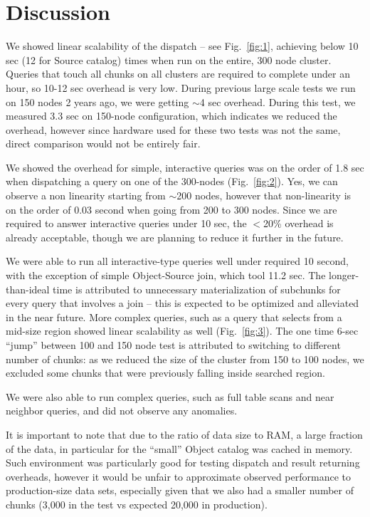 \documentclass[DM,toc]{lsstdoc}
\begin{document}
\section{Discussion}

We showed linear scalability of the dispatch – see Fig.~\ref{fig:1}, achieving below 10 sec (12 for Source catalog) times when run on the entire, 300 node cluster. Queries that touch all chunks on all clusters are required to complete under an hour, so 10-12 sec overhead is very low. During previous large scale tests we run on 150 nodes 2 years ago, we were getting $\sim$4 sec overhead. During this test, we measured 3.3 sec on 150-node configuration, which indicates we reduced the overhead, however since hardware used for these two tests was not the same, direct comparison would not be entirely fair.

We showed the overhead for simple, interactive queries was on the order of 1.8 sec when dispatching a query on one of the 300-nodes (Fig.~\ref{fig:2}). Yes, we can observe a non linearity starting from $\sim$200 nodes, however that non-linearity is on the order of 0.03 second when going from 200 to 300 nodes. Since we are required to answer interactive queries under 10 sec, the $<$20\% overhead is already acceptable, though we are planning to reduce it further in the future.

We were able to run all interactive-type queries well under required 10 second, with the exception of simple Object-Source join, which tool 11.2 sec. The longer-than-ideal time is attributed to unnecessary materialization of subchunks for every query that involves a join – this is expected to be optimized and alleviated in the near future.
More complex queries, such as a query that selects from a mid-size region showed linear scalability as well (Fig.~\ref{fig:3}). The one time 6-sec ``jump'' between 100 and 150 node test is attributed to switching to different number of chunks: as we reduced the size of the cluster from 150 to 100 nodes, we excluded some chunks that were previously falling inside searched region.

We were also able to run complex queries, such as full table scans and near neighbor queries, and did not observe any anomalies.

It is important to note that due to the ratio of data size to RAM, a large fraction of the data, in particular for the ``small'' Object catalog was cached in memory. Such environment was particularly good for testing dispatch and result returning overheads, however it would be unfair to approximate observed performance to production-size data sets, especially given that we also had a smaller number of chunks (3,000 in the test vs expected 20,000 in production).


\end{document}
